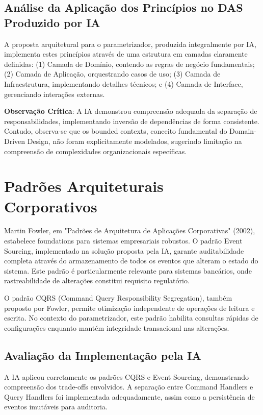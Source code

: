 \subsection{Análise da Aplicação dos Princípios no DAS Produzido por IA}

A proposta arquitetural para o parametrizador, produzida integralmente por IA, implementa estes princípios através de uma estrutura em camadas claramente definidas: (1) Camada de Domínio, contendo as regras de negócio fundamentais; (2) Camada de Aplicação, orquestrando casos de uso; (3) Camada de Infraestrutura, implementando detalhes técnicos; e (4) Camada de Interface, gerenciando interações externas.

\textbf{Observação Crítica}: A IA demonstrou compreensão adequada da separação de responsabilidades, implementando inversão de dependências de forma consistente. Contudo, observa-se que os bounded contexts, conceito fundamental do Domain-Driven Design, não foram explicitamente modelados, sugerindo limitação na compreensão de complexidades organizacionais específicas.

\section{Padrões Arquiteturais Corporativos}

Martin Fowler, em "Padrões de Arquitetura de Aplicações Corporativas" (2002), estabelece foundations para sistemas empresariais robustos. O padrão Event Sourcing, implementado na solução proposta pela IA, garante auditabilidade completa através do armazenamento de todos os eventos que alteram o estado do sistema. Este padrão é particularmente relevante para sistemas bancários, onde rastreabilidade de alterações constitui requisito regulatório.

O padrão CQRS (Command Query Responsibility Segregation), também proposto por Fowler, permite otimização independente de operações de leitura e escrita. No contexto do parametrizador, este padrão habilita consultas rápidas de configurações enquanto mantém integridade transacional nas alterações.

\subsection{Avaliação da Implementação pela IA}

A IA aplicou corretamente os padrões CQRS e Event Sourcing, demonstrando compreensão dos trade-offs envolvidos. A separação entre Command Handlers e Query Handlers foi implementada adequadamente, assim como a persistência de eventos imutáveis para auditoria.

